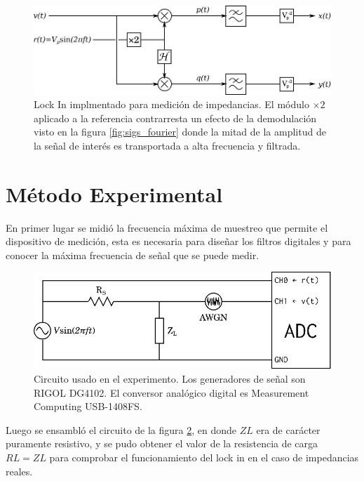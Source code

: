 \documentclass[11pt,a4paper]{extarticle}
\begin{document}
\begin{multicols}{2}
\begin{figure}[H]
	\centering
	\includegraphics[width=\linewidth]{Images/nuestro_lockin.eps}
	\caption{Lock In implmentado para medición de impedancias. El módulo $\times 2$ aplicado a la referencia contrarresta un efecto de la demodulación visto en la figura \ref{fig:sigs_fourier} donde la mitad de la amplitud de la señal de interés es transportada a alta frecuencia y filtrada.}
	\label{fig:nuestro_lockin}
\end{figure}

\section{Método Experimental}

En primer lugar se midió la frecuencia máxima de 
muestreo que permite el dispositivo de medición, esta es necesaria para diseñar los filtros digitales y para conocer la máxima frecuencia de señal que se puede medir.\\

\begin{figure}[H]
	\centering
	\includegraphics[width=\linewidth]{Images/circuito.eps}
	\caption{Circuito usado en el experimento. Los generadores de señal son RIGOL DG4102. El conversor analógico digital es Measurement Computing USB-1408FS.}
	\label{fig:circuito}
\end{figure}


Luego se ensambló el circuito de la figura 
\ref{fig:circuito}, en donde $ZL$ era de carácter
 puramente resistivo, y se pudo obtener 
el valor de la resistencia de carga $RL = ZL$ para 
comprobar el funcionamiento del lock in en el caso 
de impedancias reales.\\ 


\end{multicols}
\end{document}
